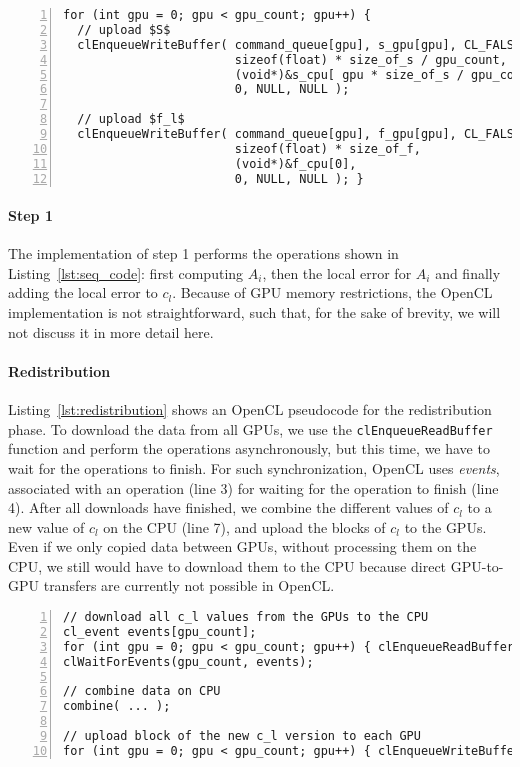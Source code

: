 \begin{lstlisting}[caption={Implementation of the upload phase in OpenCL (ommitting error checks for brevity)},label={lst:upload},numbers=left]
for (int gpu = 0; gpu < gpu_count; gpu++) {
  // upload $S$
  clEnqueueWriteBuffer( command_queue[gpu], s_gpu[gpu], CL_FALSE, 0,
                        sizeof(float) * size_of_s / gpu_count,
                        (void*)&s_cpu[ gpu * size_of_s / gpu_count ],
                        0, NULL, NULL );

  // upload $f_l$
  clEnqueueWriteBuffer( command_queue[gpu], f_gpu[gpu], CL_FALSE, 0,
                        sizeof(float) * size_of_f,
                        (void*)&f_cpu[0],
                        0, NULL, NULL ); }
\end{lstlisting}

\paragraph{Step 1}
The implementation of step 1 performs the operations shown in Listing~\ref{lst:seq_code}: first computing $A_i$, then the local error for $A_i$ and finally adding the local error to $c_l$.
Because of GPU memory restrictions, the OpenCL implementation is not straightforward, such that, for the sake of brevity, we will not discuss it in more detail here.

\paragraph{Redistribution}
Listing~\ref{lst:redistribution} shows an OpenCL pseudocode for the redistribution phase.
To download the data from all GPUs, we use the \texttt{clEnqueueReadBuffer} function and perform the operations asynchronously, but this time, we have to wait for the operations to finish.
For such synchronization, OpenCL uses \emph{events}, associated with an operation (line 3) for waiting for the operation to finish (line 4).
After all downloads have finished, we combine the different values of $c_l$ to a new value of $c_l$ on the CPU (line 7), and upload the blocks of $c_l$ to the GPUs.
Even if we only copied data between GPUs, without processing them on the CPU, we still would have to download them to the CPU because direct GPU-to-GPU transfers are currently not possible in OpenCL.

\begin{lstlisting}[caption={OpenCL pseudocode for the redistribution phase},label={lst:redistribution},numbers=left]
// download all c_l values from the GPUs to the CPU
cl_event events[gpu_count];
for (int gpu = 0; gpu < gpu_count; gpu++) { clEnqueueReadBuffer( ..., &events[gpu] ); }
clWaitForEvents(gpu_count, events);

// combine data on CPU
combine( ... );

// upload block of the new c_l version to each GPU
for (int gpu = 0; gpu < gpu_count; gpu++) { clEnqueueWriteBuffer( ... ); }
\end{lstlisting}

